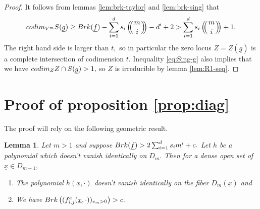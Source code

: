 \documentclass[10pt,a4paper]{amsart}
\let\ul\underline
\newtheorem{lemma}[theorem]{Lemma}
\theoremstyle{definition}
\def\multiset#1#2{\ensuremath{\left(\kern-.3em\left(\genfrac{}{}{0pt}{}{#1}{#2}\right)\kern-.3em\right)}}
\newcommand{\codim}{\textnormal{codim}}
\newcommand{\brk}{\textnormal{Brk}}
\begin{document}
\begin{proof}
    It follows from lemmas \ref{lem:brk-taylor} and \ref{lem:brk-sing} that
    \begin{equation}\label{eq:Sing-g}
        \codim_{V^m} S(\ul{g}) \ge \brk(\ul{f})-\sum_{i=1}^d s_i \multiset{m}{i}-d'+2 > \sum_{i=1}^d s_i \multiset{m}{i}+1.
    \end{equation}
    The right hand side is larger than $t,$ so in particular the zero locus $Z = Z(\ul{g})$ is a complete intersection of codimension $t.$ Inequality \eqref{eq:Sing-g} also implies that we have $\codim_Z Z\cap S(\ul{g}) > 1,$ so $Z$ is irreducible by lemma \ref{lem:R1-seq}.
\end{proof}




\section{Proof of proposition \ref{prop:diag}}

The proof will rely on the following geometric result.

\begin{lemma}\label{lem:diag-on-subspace-geo}
    Let $m>1$ and suppose  $\brk(\ul{f}) > 2\sum_{i=1}^d s_i m^i+c.$ Let $h$ be a polynomial which doesn't vanish identically on $D_m.$ Then for a dense open set of $\ul{x}\in D_{m-1},$  
    \begin{enumerate}
        \item The polynomial $h(\ul{x},\cdot)$ doesn't vanish identically on the fiber $D_{m}(\ul{x})$ and 
        \item We have $\brk \left( (f_{i,j}^e(\ul{x},\cdot))_{e_m>0} \right) > c.$ 
    \end{enumerate}
\end{lemma}
\end{document}
